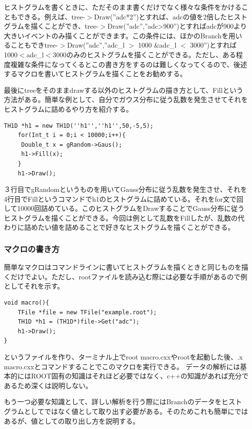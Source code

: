 \documentclass[10pt]{ujarticle}
\begin{document}
ヒストグラムを書くときに、ただそのまま書くだけでなく様々な条件をかけることもできる。例えば、tree-$>$Draw(''adc*2'')とすれば、adcの値を2倍したヒストグラムを描くことができ、tree-$>$Draw(''adc'',''adc>900'')とすればadcが900より大きいイベントのみ描くことができます。この条件には、ほかのBranchを用いることもできtree-$>$Draw(''adc'',''adc\_l $>$ 1000 \&adc\_l $<$ 3000'')とすれば1000$<$adc\_l$<$3000のみのヒストグラムを描くことができる。ただし、ある程度複雑な条件になってくるとこの書き方をするのは難しくなってくるので、後述するマクロを書いてヒストグラムを描くことをお勧めする。

最後にtreeをそのままdrawする以外のヒストグラムの描き方として、Fillという方法がある。簡単な例として、自分でガウス分布に従う乱数を発生させてそれをヒストグラムに詰めるやり方を紹介する。
\begin{lstlisting}[basicstyle=\ttfamily\footnotesize, frame=single]
    TH1D *h1 = new TH1D(''h1'',''h1'',50,-5,5);
    for(Int_t i = 0;i < 10000;i++){
     Double_t x = gRandom->Gaus();
     h1->Fill(x);
    }  
    h1->Draw();
 \end{lstlisting}
 ３行目でgRandomというものを用いてGauss分布に従う乱数を発生させ、それを4行目でFillというコマンドでh1のヒストグラムに詰めている。それをfor文で回して10000回詰めている。このヒストグラムをDrawすることでGauss分布に従うヒストグラムを描くことができる。今回は例として乱数をFillしたが、乱数の代わりに詰めたい値を詰めることで好きなヒストグラムを描くことができる。

\subsubsection{マクロの書き方}
簡単なマクロはコマンドラインに書いてヒストグラムを描くときと同じものを描くだけでよい。ただし、rootファイルを読み込む際には必要な手順があるので例としてそれを示す。
\begin{lstlisting}[basicstyle=\ttfamily\footnotesize, frame=single]
void macro(){
	TFile *file = new TFile("example.root");
	TH1D *h1 = (TH1D*)file->Get("adc");
	h1->Draw();
}
 \end{lstlisting}
というファイルを作り、ターミナル上でroot macro.cxxやrootを起動した後、.x macro.cxxとコマンドすることでこのマクロを実行できる。
データの解析には基本的にはROOT固有の知識はそれほど必要ではなく、c++の知識があれば充分であるため深くは説明しない。

もう一つ必要な知識として、詳しい解析を行う際にはBranchのデータをヒストグラムとしてではなく値として取り出す必要がある。そのためこれも簡単にではあるが、値としての取り出し方を説明する。
\end{document}
